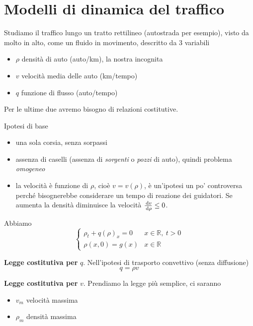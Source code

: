 \section{Modelli di dinamica del traffico}

Studiamo il traffico lungo un tratto rettilineo (autostrada per esempio), visto da molto in alto, come un fluido in movimento, descritto da $3$ variabili
\begin{itemize}
    \item $\rho $ densità di auto (auto/km), la nostra incognita
    \item $v$ velocità media delle auto (km/tempo)
    \item $q$ funzione di flusso (auto/tempo)
\end{itemize}
Per le ultime due avremo bisogno di relazioni costitutive.

Ipotesi di base
\begin{itemize}
    \item una sola corsia, senza sorpassi
    \item assenza di caselli (assenza di \textit{sorgenti} o \textit{pozzi} di auto), quindi problema \emph{omogeneo}
    \item la velocità è funzione di $\rho $, cioè $v=v(\rho)$, è un'ipotesi un po' controversa perché bisognerebbe considerare un tempo di reazione dei guidatori. Se aumenta la densità diminuisce la velocità $\frac{\,\mathrm d v}{\,\mathrm d \rho} \leq 0$.
\end{itemize}

Abbiamo
\begin{equation}
    \begin{cases}
        \rho _{t} +q(\rho)_{x} =0 & x\in \mathbb{R} ,\ t >0 \\
        \rho (x,0) =g(x)          & x\in \mathbb{R}
    \end{cases}
\end{equation}

\textbf{Legge costitutiva per} $q$.
Nell'ipotesi di trasporto convettivo (senza diffusione)
\begin{equation}
    q=\rho v
\end{equation}

\textbf{Legge costitutiva per} $v$.
Prendiamo la legge più semplice, ci saranno
\begin{itemize}
    \item $v_{m}$ velocità massima
    \item $\rho _{m}$ densità massima
\end{itemize}

